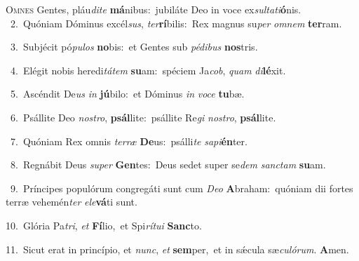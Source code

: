 \lettrine{\initial\textcolor{\initialcolor}{O}}{mnes} Gentes, pláu\-\textit{di}\-\textit{te} \textbf{má}\-nibus:~\star jubiláte Deo in voce ex\-\textit{sul}\-\textit{ta}\textit{ti}\textbf{ó}nis.\\
{\numbfont\textcolor{\numbcolor}{~2.}}~Quóniam Dóminus excél\-\textit{sus}\-, \textit{ter}\-\textbf{rí}bilis:~\star Rex magnus su\textit{per} \textit{om}\-\textit{nem} \textbf{ter}\-ram.\par
{\numbfont\textcolor{\numbcolor}{~3.}}~Subjécit pó\-\textit{pu}\-\textit{los} \textbf{no}\-bis:~\star et Gentes sub \textit{pé}\-\textit{di}\textit{bus} \textbf{nos}\-tris.\par
{\numbfont\textcolor{\numbcolor}{~4.}}~Elégit nobis heredi\-\textit{tá}\-\textit{tem} \textbf{su}\-am:~\star spéciem Ja\-\textit{cob}\-, \textit{quam} \textit{di}\-\textbf{lé}xit.\par
{\numbfont\textcolor{\numbcolor}{~5.}}~Ascéndit De\textit{us} \textit{in} \textbf{jú}\-bilo:~\star et Dóminus \textit{in} \textit{vo}\-\textit{ce} \textbf{tu}\-bæ.\par
{\numbfont\textcolor{\numbcolor}{~6.}}~Psállite Deo \textit{nos}\-\textit{tro}, \textbf{psál}\-lite:~\star psállite Re\textit{gi} \textit{nos}\-\textit{tro}, \textbf{psál}\-lite.\par
{\numbfont\textcolor{\numbcolor}{~7.}}~Quóniam Rex omnis \textit{ter}\-\textit{ræ} \textbf{De}\-us:~\star psálli\textit{te} \textit{sa}\-\textit{pi}\textbf{én}ter.\par
{\numbfont\textcolor{\numbcolor}{~8.}}~Regnábit Deus \textit{su}\-\textit{per} \textbf{Gen}\-tes:~\star Deus sedet super se\textit{dem} \textit{sanc}\-\textit{tam} \textbf{su}\-am.\par
{\numbfont\textcolor{\numbcolor}{~9.}}~Príncipes populórum congregáti sunt cum \textit{De}\-\textit{o} \textbf{A}\-braham:~\star quóniam dii fortes terræ vehemén\textit{ter} \textit{e}\-\textit{le}\textbf{vá}ti sunt.\par
{\numbfont\textcolor{\numbcolor}{10.}}~Glória Pa\-\textit{tri}\-, \textit{et} \textbf{Fí}\-lio,~\star et Spi\-\textit{rí}\-\textit{tu}\textit{i} \textbf{Sanc}\-to.\par
{\numbfont\textcolor{\numbcolor}{11.}}~Sicut erat in princípio, et \textit{nunc}\-, \textit{et} \textbf{sem}\-per,~\star et in sǽcula sæ\-\textit{cu}\-\textit{ló}\textit{rum}. \textbf{A}\-men.\par
